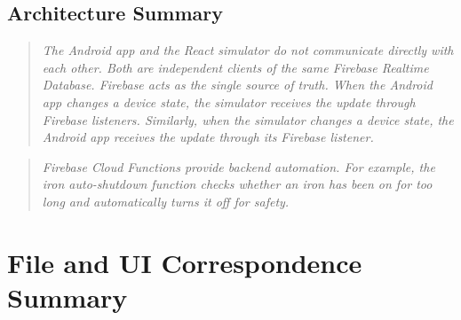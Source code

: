 \documentclass[11pt,a4paper]{article}
\begin{document}
\subsection{Architecture Summary}
\begin{quote}
\textit{The Android app and the React simulator do not communicate directly with each other. Both are independent clients of the same Firebase Realtime Database. Firebase acts as the single source of truth. When the Android app changes a device state, the simulator receives the update through Firebase listeners. Similarly, when the simulator changes a device state, the Android app receives the update through its Firebase listener.}
\end{quote}

\begin{quote}
\textit{Firebase Cloud Functions provide backend automation. For example, the iron auto-shutdown function checks whether an iron has been on for too long and automatically turns it off for safety.}
\end{quote}

\section{File and UI Correspondence Summary}
\end{document}
